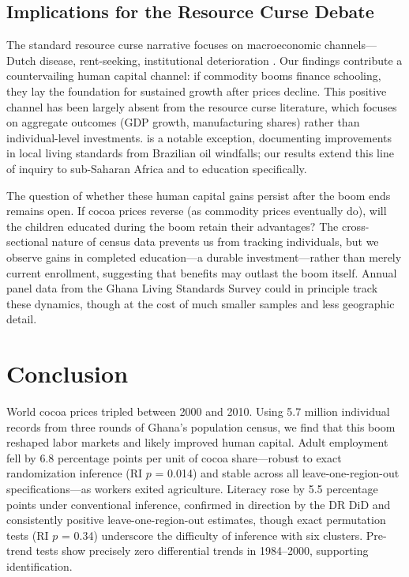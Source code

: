 \documentclass[12pt]{article}
\begin{document}
\subsection{Implications for the Resource Curse Debate}

The standard resource curse narrative focuses on macroeconomic channels---Dutch disease, rent-seeking, institutional deterioration \citep{vanderploeg2011, corden1982}. Our findings contribute a countervailing human capital channel: if commodity booms finance schooling, they lay the foundation for sustained growth after prices decline. This positive channel has been largely absent from the resource curse literature, which focuses on aggregate outcomes (GDP growth, manufacturing shares) rather than individual-level investments. \citet{aragoncaselli2013} is a notable exception, documenting improvements in local living standards from Brazilian oil windfalls; our results extend this line of inquiry to sub-Saharan Africa and to education specifically.

The question of whether these human capital gains persist after the boom ends remains open. If cocoa prices reverse (as commodity prices eventually do), will the children educated during the boom retain their advantages? The cross-sectional nature of census data prevents us from tracking individuals, but we observe gains in completed education---a durable investment---rather than merely current enrollment, suggesting that benefits may outlast the boom itself. Annual panel data from the Ghana Living Standards Survey could in principle track these dynamics, though at the cost of much smaller samples and less geographic detail.


\section{Conclusion}
\label{sec:conclusion}

World cocoa prices tripled between 2000 and 2010. Using 5.7 million individual records from three rounds of Ghana's population census, we find that this boom reshaped labor markets and likely improved human capital. Adult employment fell by 6.8 percentage points per unit of cocoa share---robust to exact randomization inference (RI $p$ = 0.014) and stable across all leave-one-region-out specifications---as workers exited agriculture. Literacy rose by 5.5 percentage points under conventional inference, confirmed in direction by the DR DiD and consistently positive leave-one-region-out estimates, though exact permutation tests (RI $p$ = 0.34) underscore the difficulty of inference with six clusters. Pre-trend tests show precisely zero differential trends in 1984--2000, supporting identification.
\end{document}
